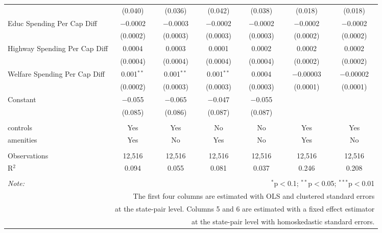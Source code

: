 \begin{table}[!htbp]
\begin{tabular}{@{\extracolsep{5pt}}lcccccc}
  & (0.040) & (0.036) & (0.042) & (0.038) & (0.018) & (0.018) \\ 
  Educ Spending Per Cap Diff & $-$0.0002 & $-$0.0003 & $-$0.0002 & $-$0.0002 & $-$0.0002 & $-$0.0002 \\ 
  & (0.0002) & (0.0003) & (0.0003) & (0.0003) & (0.0002) & (0.0002) \\ 
  Highway Spending Per Cap Diff & 0.0004 & 0.0003 & 0.0001 & 0.0002 & 0.0002 & 0.0002 \\ 
  & (0.0004) & (0.0004) & (0.0004) & (0.0004) & (0.0002) & (0.0002) \\ 
  Welfare Spending Per Cap Diff & 0.001$^{**}$ & 0.001$^{**}$ & 0.001$^{**}$ & 0.0004 & $-$0.00003 & $-$0.00002 \\ 
  & (0.0002) & (0.0003) & (0.0003) & (0.0003) & (0.0001) & (0.0001) \\ 
  Constant & $-$0.055 & $-$0.065 & $-$0.047 & $-$0.055 &  &  \\ 
  & (0.085) & (0.086) & (0.087) & (0.087) &  &  \\ 
 \hline \\[-1.8ex] 
controls & Yes & Yes & No & No & Yes & Yes \\ 
amenities & Yes & No & Yes & No & Yes & No \\ 
\hline \\[-1.8ex] 
Observations & 12,516 & 12,516 & 12,516 & 12,516 & 12,516 & 12,516 \\ 
R$^{2}$ & 0.094 & 0.055 & 0.081 & 0.037 & 0.246 & 0.208 \\ 
\hline 
\hline \\[-1.8ex] 
\textit{Note:}  & \multicolumn{6}{r}{$^{*}$p$<$0.1; $^{**}$p$<$0.05; $^{***}$p$<$0.01} \\ 
 & \multicolumn{6}{r}{The first four columns are estimated with OLS and clustered standard errors} \\ 
 & \multicolumn{6}{r}{at the state-pair level. Columns 5 and 6 are estimated with a fixed effect estimator} \\ 
 & \multicolumn{6}{r}{at the state-pair level with homoskedastic standard errors.} \\ 
\end{tabular} 
\end{table} 
